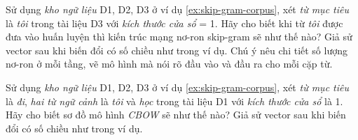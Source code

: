 \begin{exer}
Sử dụng \textit{kho ngữ liệu} D1, D2, D3 ở ví dụ \ref{ex:skip-gram-corpus}, xét \textit{từ mục tiêu} là \textit{tôi} trong tài liệu D3 với \textit{kích thước cửa sổ} = 1. Hãy cho biết khi từ \textit{tôi} được đưa vào huấn luyện thì kiến trúc mạng nơ-ron skip-gram sẽ như thế nào? Giả sử vector sau khi biến đổi có số chiều như trong ví dụ. Chú ý nêu chi tiết số lượng nơ-ron ở mỗi tầng, vẽ mô hình mà nói rõ đầu vào và đầu ra cho mỗi cặp từ.
\end{exer}

\begin{exer}
Sử dụng \textit{kho ngữ liệu} D1, D2, D3 ở ví dụ \ref{ex:skip-gram-corpus}, xét \textit{từ mục tiêu} là \textit{đi}, \textit{hai từ ngữ cảnh} là \textit{tôi} và \textit{học} trong tài liệu D1 với \textit{kích thước cửa sổ} là 1. Hãy cho biết sơ đồ mô hình \textit{CBOW} sẽ như thế nào? Giả sử vector sau khi biến đổi có số chiều như trong ví dụ.
\end{exer}